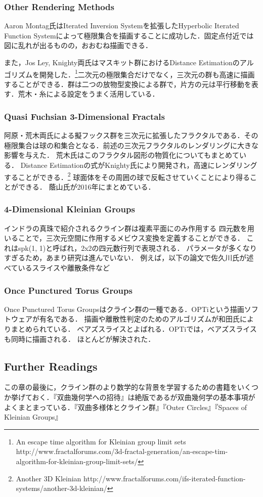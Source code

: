 \subsubsection{Other Rendering Methods}
Aaron Montag氏はIterated Inversion Systemを拡張したHyperbolic Iterated Function Systemによって極限集合を描画することに成功した\cite{hyperbolicIFS}．固定点付近では図に乱れが出るものの，おおむね描画できる．

また，Jos Ley, Knighty両氏はマスキット群におけるDistance Estimationのアルゴリズムを開発した．\footnote{An escape time algorithm for Kleinian group limit sets http://www.fractalforums.com/3d-fractal-generation/an-escape-tim-algorithm-for-kleinian-group-limit-sets/}二次元の極限集合だけでなく，三次元の群も高速に描画することができる．群は二つの放物型変換による群で，片方の元は平行移動を表す．荒木・糸\cite{maskit}による設定をうまく活用している．

\subsubsection{Quasi Fuchsian 3-Dimensional Fractals}
阿原・荒木両氏による擬フックス群を三次元に拡張したフラクタルである\cite{sphairahedra}\cite{sphairahedraJa}．その極限集合は球の和集合となる．前述の三次元フラクタルのレンダリングに大きな影響を与えた．
荒木氏はこのフラクタル図形の物質化についてもまとめている\cite{materializing}．
Distance Estimationの式がKnighty氏により開発され，高速にレンダリングすることができる．\footnote{Another 3D Kleinian http://www.fractalforums.com/ifs-iterated-function-systems/another-3d-kleinian/}
球面体をその周囲の球で反転させていくことにより得ることができる．
蔭山氏が2016年にまとめている\cite{kageyama}．

\subsubsection{4-Dimensional Kleinian Groups}
インドラの真珠で紹介されるクライン群は複素平面にのみ作用する
四元数を用いることで，三次元空間に作用するメビウス変換を定義することができる．
これはspk(1, 1)と呼ばれ，2x2の四元数行列で表現される．
パラメータが多くなりすぎるため，あまり研究は進んでいない．
例えば，以下の論文で佐久川氏が述べているスライスや離散条件など

\subsubsection{Once Punctured Torus Groups}
Once Punctured Torus Groupsはクライン群の一種である．OPTiという描画ソフトウェアが有名である．
描画や離散性判定のためのアルゴリズムが和田氏によりまとめられている．
ベアズスライスとよばれる．OPTiでは，ベアズスライスも同時に描画される．
ほとんどが解決された．

\subsection{Further Readings}
この章の最後に，クライン群のより数学的な背景を学習するための書籍をいくつか挙げておく．『双曲幾何学への招待』\cite{invitation}は絶版であるが双曲幾何学の基本事項がよくまとまっている．『双曲多様体とクライン群』\cite{manifold}『Outer Circles』\cite{outerCircles}『Spaces of Kleinian Groups』\cite{space}